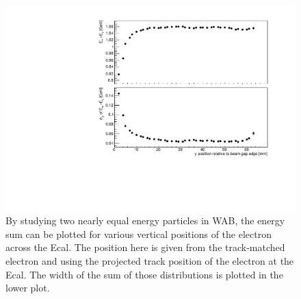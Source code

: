 \documentclass[twoside]{article}
\begin{document}
\begin{figure}[H]
  \centering
      \includegraphics[width=1.0\textwidth]{pics/WAB_sumHalf.pdf}
  \caption{By studying two nearly equal energy particles in WAB, the energy sum can be plotted for various vertical positions of the electron across the Ecal. The position here is given from the track-matched electron and using the projected track position of the electron at the Ecal. The width of the sum of those distributions is plotted in the lower plot. }
  \label{wabHalf}
\end{figure}
  
\end{document}
